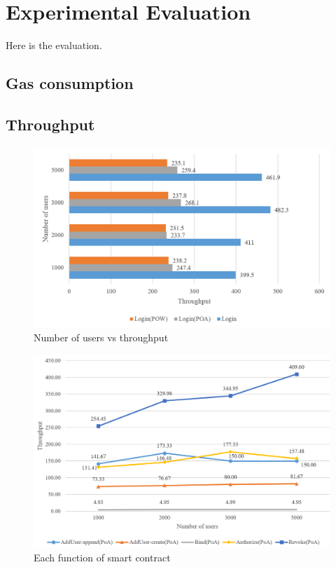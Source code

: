 \chapter{Experimental Evaluation}
\label{chapter:evaluation}

Here is the evaluation.

\section{Gas consumption}


\section{Throughput}
\begin{figure}[htb]
    \centering
    \includegraphics[height=!,width=0.9\linewidth,keepaspectratio=true]{figures/login-throughput.png}
    \caption{{\footnotesize Number of users vs throughput}}
    \label{fig:loginThroughput}
\end{figure}

\begin{figure}[htb]
    \centering
    \includegraphics[height=!,width=1\linewidth,keepaspectratio=true]{figures/smart_contract_tps.png}
    \caption{{\footnotesize Each function of smart contract}}
    \label{fig:contract_tps}
\end{figure}


